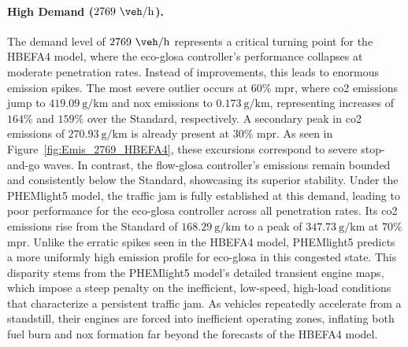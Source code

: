 \paragraph{High Demand ($2769~\unit{\veh\per\hour}$).}
The demand level of $2769~\unit{\veh\per\hour}$ represents a critical turning point for the HBEFA4 model, where the \ac{eco-glosa} controller's performance collapses at moderate penetration rates. Instead of improvements, this leads to enormous emission spikes. The most severe outlier occurs at $60\%$ \ac{mpr}, where \ac{co2} emissions jump to $419.09~\unit{\gram\per\kilo\metre}$ and \ac{nox} emissions to $0.173~\unit{\gram\per\kilo\metre}$, representing increases of $164\%$ and $159\%$ over the Standard, respectively. A secondary peak in \ac{co2} emissions of $270.93~\unit{\gram\per\kilo\metre}$ is already present at $30\%$ \ac{mpr}. As seen in Figure~\vref{fig:Emis_2769_HBEFA4}, these excursions correspond to severe stop-and-go waves. In contrast, the \ac{flow-glosa} controller's emissions remain bounded and consistently below the Standard, showcasing its superior stability.
\mynewline
Under the PHEMlight5 model, the traffic jam is fully established at this demand, leading to poor performance for the \ac{eco-glosa} controller across all penetration rates. Its \ac{co2} emissions rise from the Standard of $168.29~\unit{\gram\per\kilo\metre}$ to a peak of $347.73~\unit{\gram\per\kilo\metre}$ at $70\%$ \ac{mpr}. Unlike the erratic spikes seen in the HBEFA4 model, PHEMlight5 predicts a more uniformly high emission profile for \ac{eco-glosa} in this congested state. This disparity stems from the PHEMlight5 model’s detailed transient engine maps, which impose a steep penalty on the inefficient, low-speed, high-load conditions that characterize a persistent traffic jam. As vehicles repeatedly accelerate from a standstill, their engines are forced into inefficient operating zones, inflating both fuel burn and \ac{nox} formation far beyond the forecasts of the HBEFA4 model.

